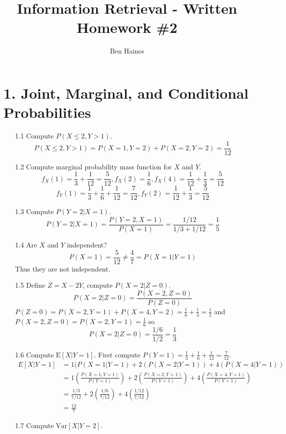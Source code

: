 \documentclass[paper=a4, fontsize=11pt]{jhwhw} %
\begin{document}
\title{Information Retrieval - Written Homework \#2}
\author{Ben Haines}

\section*{1. Joint, Marginal, and Conditional Probabilities} 
\begin{enumerate}
    \item [1.1] Compute $P(X \le 2, Y > 1)$.
        $$P(X \le 2, Y > 1) = P(X = 1, Y = 2) + P(X = 2, Y = 2) = \frac{1}{12}$$
    \item [1.2] Compute marginal probability mass function for $X$ and $Y$.
        $$f_X(1)  = \frac{1}{3} + \frac{1}{12} = \frac{5}{12}, f_X(2) = \frac{1}{6}, f_X(4) = \frac{1}{12} + \frac{1}{3} = \frac{5}{12}$$
        $$f_Y(1)  = \frac{1}{3} + \frac{1}{6} + \frac{1}{12} = \frac{7}{12}, f_Y(2) = \frac{1}{12} + \frac{1}{3} = \frac{5}{12}$$
    \item [1.3] Compute $P(Y = 2|X = 1)$.
        $$P(Y = 2|X = 1) = \frac{P(Y = 2, X = 1)}{P(X = 1)} = \frac{1/12}{1/3 + 1/12} = \frac{1}{5}$$
    \item [1.4] Are $X$ and $Y$ independent?\\
        $$P(X = 1) = \frac{5}{12} \not= \frac{4}{7} = P(X = 1|Y = 1)$$
        Thus they are not independent.
    \item [1.5] Define $Z = X - 2Y$, compute $P(X = 2|Z = 0)$. 
        $$P(X = 2|Z = 0) = \frac{P(X = 2, Z = 0)}{P(Z = 0)}$$
        $P(Z = 0) = P(X = 2, Y = 1) + P(X = 4, Y = 2) = \frac{1}{6} + \frac{1}{3} = \frac{1}{2}$ and
        $P(X = 2, Z = 0) = P(X = 2, Y = 1) = \frac{1}{6}$ so 
        $$P(X = 2|Z = 0) = \frac{1/6}{1/2} = \frac{1}{3}$$
    \item [1.6] Compute $\mathrm{E}[X|Y = 1]$.
        First compute $P(Y = 1) = \frac{1}{3} + \frac{1}{6} + \frac{1}{12} = \frac{7}{12}$.
        \begin{align*}
            E[X|Y = 1] &= 1(P(X = 1|Y = 1) + 2(P(X = 2| Y = 1)) + 4(P(X = 4|Y = 1))\\
                       &= 1(\frac{P(X = 1, Y = 1)}{P(Y = 1)}) + 2(\frac{P(X = 2, Y = 1)}{P(Y = 1)}) + 4(\frac{P(X = 4, Y = 1)}{P(Y = 1)})\\
                       &= \frac{1/3}{7/12} + 2(\frac{1/6}{7/12}) + 4(\frac{1/12}{7/12})\\
                       &= \frac{12}{7}
        \end{align*}
    \item [1.7] Compute $\mathrm{Var}[X|Y = 2]$.

\end{enumerate}
\end{document}
